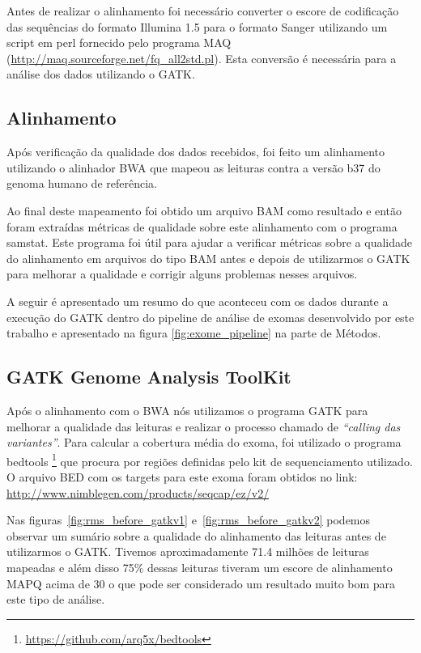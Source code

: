 Antes de realizar o alinhamento foi necessário converter o escore de codificação das sequências do formato Illumina 1.5 para o formato Sanger utilizando um script em perl fornecido pelo programa MAQ (\url{http://maq.sourceforge.net/fq_all2std.pl}). Esta conversão é necessária para a análise dos dados utilizando o GATK.

\subsection{Alinhamento}

Após verificação da qualidade dos dados recebidos, foi feito um alinhamento utilizando o alinhador BWA que mapeou as leituras contra a versão b37 do genoma humano de referência.

Ao final deste mapeamento foi obtido um arquivo BAM como resultado e então foram extraídas métricas de qualidade sobre este alinhamento com o programa samstat. Este programa foi útil para ajudar a verificar métricas sobre a qualidade do alinhamento em arquivos do tipo BAM antes e depois de utilizarmos o GATK para melhorar a qualidade e corrigir alguns problemas nesses arquivos.

A seguir é apresentado um resumo do que aconteceu com os dados durante a execução do GATK dentro do pipeline de análise de exomas desenvolvido por este trabalho e apresentado na figura \ref{fig:exome_pipeline} na parte de Métodos.

\subsection{GATK Genome Analysis ToolKit}

Após o alinhamento com o BWA nós utilizamos o programa GATK para melhorar a qualidade das leituras e realizar o processo chamado de \textit{``calling das variantes''}. Para calcular a cobertura média do exoma, foi utilizado o programa bedtools \footnote{\url{https://github.com/arq5x/bedtools}} que procura por regiões definidas pelo kit de sequenciamento utilizado. O arquivo BED com os targets para este exoma foram obtidos no link: \href{http://www.nimblegen.com/products/seqcap/ez/v2/}{http://www.nimblegen.com/products/seqcap/ez/v2/}

Nas figuras~\ref{fig:rms_before_gatkv1} e~\ref{fig:rms_before_gatkv2} podemos observar um sumário sobre a qualidade do alinhamento das leituras antes de utilizarmos o GATK. Tivemos aproximadamente 71.4 milhões de leituras mapeadas e além disso 75\% dessas leituras tiveram um escore de alinhamento MAPQ acima de 30 o que pode ser considerado um resultado muito bom para este tipo de análise.

